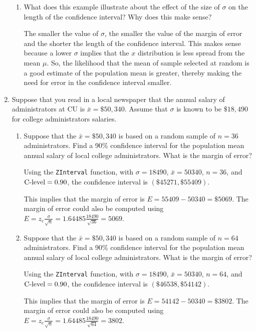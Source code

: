 \begin{enumerate}
\begin{enumerate}
	\item What does this example illustrate about the effect of the size of $\sigma$ on the length of the confidence interval? Why does this make sense? 
	
	{\answer The smaller the value of $\sigma$, the smaller the value of the margin of error and the shorter the length of the confidence interval.  This makes sense because a lower $\sigma$ implies that the $x$ distribution is less spread from the mean $\mu$. So, the likelihood that the mean of sample selected at random is a good estimate of the population mean is greater, thereby making the need for error in the confidence interval smaller.
	} 
	\end{enumerate}

\vfill
\pagebreak
	
\item Suppose that you read in a local newspaper that the annual salary of administrators at CU is $\bar x = \$50,340$. Assume that $\sigma$ is known to be $\$18,490$ for college administrators salaries. 

	\begin{enumerate}
	\item Suppose that the $\bar x = \$50,340$ is based on a random sample of $n=36$ administrators. Find a 90\% confidence interval for the population mean annual salary of local college administrators. What is the margin of error? 
	
	{\answer Using the \texttt{ZInterval} function, with $\sigma = 18490$, $\bar{x} = 50340$, $n=36$, and $\textnormal{C-level} = 0.90$, the confidence interval is $(\$45271, \$55409)$. 
	
	This implies that the margin of error is $E = 55409 - 50340 = \$5069$. 
	The margin of error could also be computed using $\displaystyle E = z_c\frac{\sigma}{\sqrt{n}} = 1.64485\frac{18490}{\sqrt{36}} = 5069$.
	} 

	\item Suppose that the $\bar x = \$50,340$ is based on a random sample of $n=64$ administrators. Find a 90\% confidence interval for the population mean annual salary of local college administrators. What is the margin of error? 
	
	{\answer Using the \texttt{ZInterval} function, with $\sigma = 18490$, $\bar{x} = 50340$, $n=64$, and $\textnormal{C-level} = 0.90$, the confidence interval is $(\$46538, \$54142)$. 

	This implies that the margin of error is $E = 54142 - 50340 = \$3802$. 
	The margin of error could also be computed using $\displaystyle E = z_c\frac{\sigma}{\sqrt{n}} = 1.64485\frac{18490}{\sqrt{64}} = 3802$.
	} 


\end{enumerate}
\end{enumerate}
